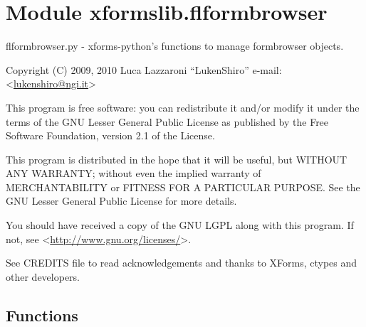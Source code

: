 %
%
%


\section{Module xformslib.flformbrowser}

    \label{xformslib:flformbrowser}

flformbrowser.py - xforms-python's functions to manage formbrowser
objects.

Copyright (C) 2009, 2010  Luca Lazzaroni ``LukenShiro''
e-mail: <\href{mailto:lukenshiro@ngi.it}{lukenshiro@ngi.it}>

This program is free software: you can redistribute it and/or modify
it under the terms of the GNU Lesser General Public License as
published by the Free Software Foundation, version 2.1 of the License.

This program is distributed in the hope that it will be useful,
but WITHOUT ANY WARRANTY; without even the implied warranty of
MERCHANTABILITY or FITNESS FOR A PARTICULAR PURPOSE. See the
GNU Lesser General Public License for more details.

You should have received a copy of the GNU LGPL along with this
program. If not, see <\href{http://www.gnu.org/licenses/}{http://www.gnu.org/licenses/}>.

See CREDITS file to read acknowledgements and thanks to XForms,
ctypes and other developers.


  \subsection{Functions}

    \label{xformslib:flformbrowser:fl_addto_formbrowser}

